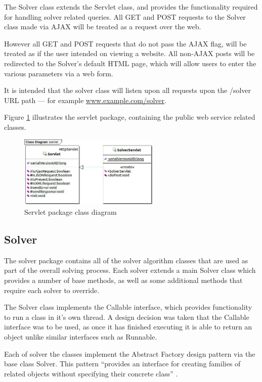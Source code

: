 The Solver class extends the Servlet class, and provides the functionality 
required for handling solver related queries. All GET and POST requests to the
Solver class made via AJAX will be treated as a request over the web. 

However all GET and POST requests that do not pass the AJAX flag, will be 
treated as if the user intended on viewing a website. All non-AJAX posts will be 
redirected to the Solver's default HTML page, which will allow users to enter 
the various parameters via a web form.

It is intended that the solver class will listen upon all requests upon the 
/solver URL path --- for example \href{}{www.example.com/solver}.

Figure \ref{fig:servlet_package} illustrates the servlet package, containing 
the public web service related classes.

\begin{figure}[H]
  \centering
  \includegraphics[width=0.6\textwidth]{class/servlet.jpg}
  \caption{Servlet package class diagram}
  \label{fig:servlet_package}
\end{figure}


\subsection{Solver}
\label{sub:solver}

The solver package contains all of the solver algorithm classes that are 
used as part of the overall solving process. Each solver extends a main Solver
class which provides a number of base methods, as well as some additional 
methods that require each solver to override.

The Solver class implements the Callable interface, which provides functionality
to run a class in it's own thread. A design decision was taken that the Callable
interface was to be used, as once it has finished executing it is able to return
an object unlike similar interfaces such as Runnable.

Each of solver the classes implement the Abstract Factory design pattern via the 
base class Solver. This pattern ``provides an interface for creating families of
related objects without specifying their concrete class'' \citep{gof}.


